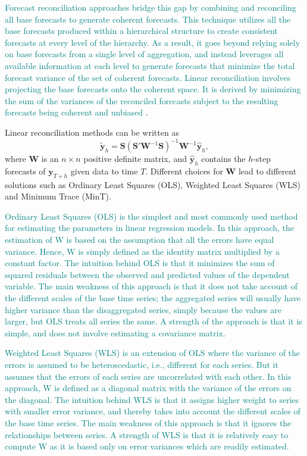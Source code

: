 \documentclass[
  authoryear,
  preprint,
  3p]{elsarticle}
\begin{document}
\textcolor{teal}{Forecast reconciliation approaches bridge this gap by combining and reconciling all base forecasts to generate coherent forecasts. This technique utilizes all the base forecasts produced within a hierarchical structure to create consistent forecasts at every level of the hierarchy. As a result, it goes beyond relying solely on base forecasts from a single level of aggregation, and instead leverages all available information at each level to generate forecasts that minimize the total forecast variance of the set of coherent forecasts.}
\textcolor{teal}{Linear reconciliation involves projecting the base forecasts onto the coherent space. It is derived by minimizing the sum of the variances of the reconciled forecasts subject to the resulting forecasts being coherent and unbiased}
\citep{WicEtAl2019}.

Linear reconciliation methods can be written \citep{WicEtAl2019} as \[
  \tilde{\bm{y}}_h = \bm{S}(\bm{S}'\bm{W}^{-1}\bm{S})^{-1}\bm{W}^{-1}\hat{\bm{y}}_h,
\] where \(\bm{W}\) is an \(n \times n\) positive definite matrix, and
\(\hat{\bm{y}}_h\) contains the \(h\)-step forecasts of \(\bm{y}_{T+h}\)
given data to time \(T\). Different choices for \(\bm{W}\) lead to
different solutions such as Ordinary Least Squares (OLS), Weighted Least
Squares (WLS) and Minimum Trace (MinT).

\textcolor{teal}{Ordinary Least Squares (OLS) is the simplest and most commonly used method for estimating the parameters in linear regression models. In this approach, the estimation of W is based on the assumption that all the errors have equal variance. Hence, W is simply defined as the identity matrix multiplied by a constant factor. The intuition behind OLS is that it minimizes the sum of squared residuals between the observed and predicted values of the dependent variable. The main weakness of this approach is that it does not take account of the different scales of the base time series; the aggregated series will usually have higher variance than the disaggregated series, simply because the values are larger, but OLS treats all series the same. A strength of the approach is that it is simple, and does not involve estimating a covariance matrix.}

\textcolor{teal}{Weighted Least Squares (WLS) is an extension of OLS where the variance of the errors is assumed to be heteroscedastic, i.e., different for each series. But it assumes that the errors of each series are uncorrelated with each other. In this approach, W is defined as a diagonal matrix with the variance of the errors on the diagonal. The intuition behind WLS is that it assigns higher weight to series with smaller error variance, and thereby takes into account the different scales of the base time series. The main weakness of this approach is that it ignores the relationships between series. A strength of WLS is that it is relatively easy to compute W as it is based only on error variances which are readily estimated.}
\end{document}
